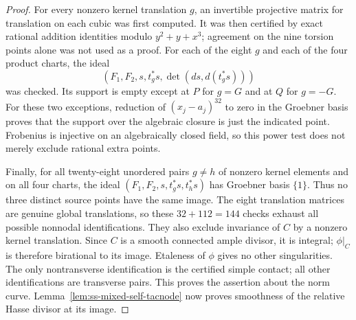 \begin{proof}
For every nonzero kernel translation $g$, an invertible projective
matrix for translation on each cubic was first computed. It was
then certified by exact rational addition identities modulo
$y^2+y+x^3$; agreement on the nine torsion points alone was not
used as a proof. For each of the eight $g$ and each of the four
product charts, the ideal
\[
       (F_1,F_2,s,t_g^*s,\det(ds,d(t_g^*s)))
\]
was checked. Its support is empty except at $P$ for $g=G$ and
at $Q$ for $g=-G$. For these two exceptions, reduction of
$(x_j-a_j)^{32}$ to zero in the Groebner basis proves that the
support over the algebraic closure is just the indicated point.
Frobenius is injective on an algebraically closed field, so this
power test does not merely exclude rational extra points.

Finally, for all twenty-eight unordered pairs $g\ne h$ of nonzero
kernel elements and on all four charts, the ideal
$(F_1,F_2,s,t_g^*s,t_h^*s)$ has Groebner basis $\{1\}$.
Thus no three distinct source points have the same image.
The eight translation matrices are genuine global translations,
so these $32+112=144$ checks exhaust all possible nonnodal
identifications. They also exclude invariance of $C$ by a nonzero
kernel translation. Since $C$ is a smooth connected ample divisor,
it is integral; $\phi|_C$ is therefore birational to its image.
Etaleness of $\phi$ gives no other singularities. The only nontransverse
identification is the certified simple contact; all other
identifications are transverse pairs. This proves the assertion
about the norm curve. Lemma~\ref{lem:ss-mixed-self-tacnode} now
proves smoothness of the relative Hasse divisor at its image.
\end{proof}

